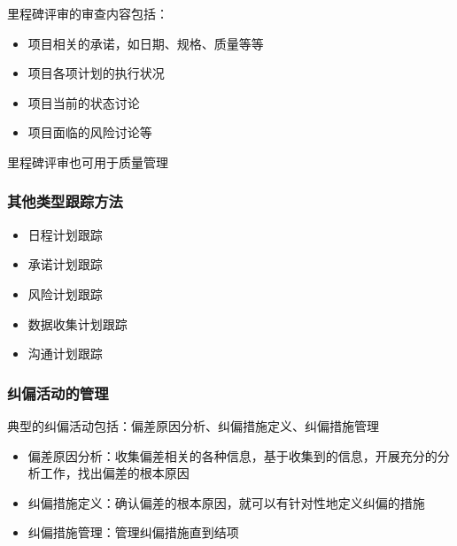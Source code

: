 里程碑评审的审查内容包括：
\vspace{-0.8em}
\begin{multicols}{2}
    \begin{itemize}
        \item 项目相关的承诺，如日期、规格、质量等等
        \item 项目各项计划的执行状况
        \item 项目当前的状态讨论
        \item 项目面临的风险讨论等
    \end{itemize}
\end{multicols}
\vspace{-1em}

里程碑评审也可用于质量管理

\subsubsection{其他类型跟踪方法}
\vspace{-0.8em}
\begin{multicols}{3}
    \begin{itemize}
        \item 日程计划跟踪
        \item 承诺计划跟踪
        \item 风险计划跟踪
        \item 数据收集计划跟踪
        \item 沟通计划跟踪
    \end{itemize}
\end{multicols}
\vspace{-1em}

\subsubsection{纠偏活动的管理}
典型的纠偏活动包括：偏差原因分析、纠偏措施定义、纠偏措施管理
\begin{itemize}
    \item 偏差原因分析：收集偏差相关的各种信息，基于收集到的信息，开展充分的分析工作，找出偏差的根本原因
    \item 纠偏措施定义：确认偏差的根本原因，就可以有针对性地定义纠偏的措施
    \item 纠偏措施管理：管理纠偏措施直到结项
\end{itemize}

